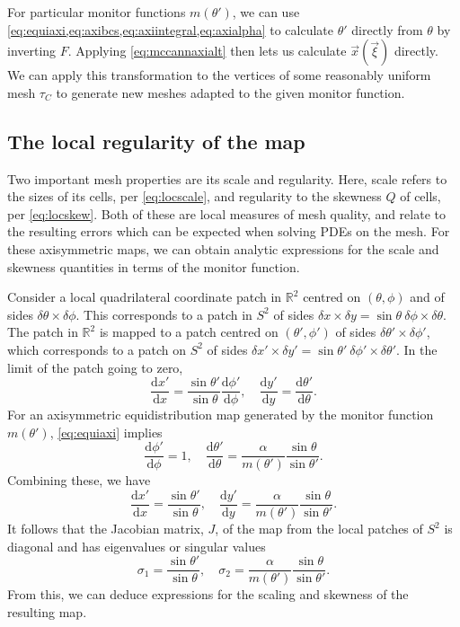 \documentclass[11pt, a4paper]{scrartcl}  %
\theoremstyle{plain}
\theoremstyle{definition}
\numberwithin{equation}{section}
\newcommand{\dd}[2]{\frac{\mathrm{d} #1}{\mathrm{d} #2}}
\begin{document}
For particular monitor functions $m(\theta')$, we can use
\cref{eq:equiaxi,eq:axibcs,eq:axiintegral,eq:axialpha} to calculate
$\theta'$ directly from $\theta$ by inverting $F$. Applying
\cref{eq:mccannaxialt} then lets us calculate $\vec{x}(\vec{\xi})$
directly. We can apply this transformation to the vertices of some
reasonably uniform mesh $\tau_C$ to generate new meshes adapted to the
given monitor function.

\subsection{The local regularity of the map}
\label{ssec:localreg}

Two important mesh properties are its scale and regularity. Here, scale
refers to the sizes of its cells, per \cref{eq:locscale}, and regularity
to the skewness $Q$ of cells, per \cref{eq:locskew}. Both of these are
local measures of mesh quality, and relate to the resulting errors which
can be expected when solving PDEs on the mesh. For these axisymmetric
maps, we can obtain analytic expressions for the scale and skewness
quantities in terms of the monitor function.

Consider a local quadrilateral coordinate patch in $\mathbb{R}^2$
centred on $(\theta, \phi)$ and of sides $\delta \theta \times \delta \phi$.
This corresponds to a patch in $S^2$ of sides
$\delta x \times \delta y = \sin\theta\ \delta \phi \times \delta \theta$.
The patch in $\mathbb{R}^2$ is mapped to a patch centred on
$(\theta', \phi')$ of sides $\delta \theta' \times \delta \phi'$, which
corresponds to a patch on $S^2$ of sides
$\delta x' \times \delta y' = \sin\theta'\ \delta \phi' \times \delta \theta'$.
In the limit of the patch going to zero,
\begin{equation}
\dd{x'}{x} = \frac{\sin\theta'}{\sin\theta} \dd{\phi'}{\phi}, \quad
\dd{y'}{y} = \dd{\theta'}{\theta}.
\end{equation}
For an axisymmetric equidistribution map generated by the monitor
function $m(\theta')$, \cref{eq:equiaxi} implies
\begin{equation}
\dd{\phi'}{\phi} = 1, \quad
\dd{\theta'}{\theta} = \frac{\alpha}{m(\theta')} \frac{\sin\theta}{\sin\theta'}.
\end{equation}
Combining these, we have
\begin{equation}
\dd{x'}{x} = \frac{\sin\theta'}{\sin\theta}, \quad
\dd{y'}{y} = \frac{\alpha}{m(\theta')} \frac{\sin\theta}{\sin\theta'}.
\end{equation}
It follows that the Jacobian matrix, $J$, of the map from the local
patches of $S^2$ is diagonal and has eigenvalues or singular values
\begin{equation}
\label{eq:eigeqn}
\sigma_1 = \frac{\sin\theta'}{\sin\theta}, \quad \sigma_2 = \frac{\alpha}{m(\theta')} \frac{\sin\theta}{\sin\theta'}.
\end{equation}
From this, we can deduce expressions for the scaling and skewness of the
resulting map.
\end{document}
